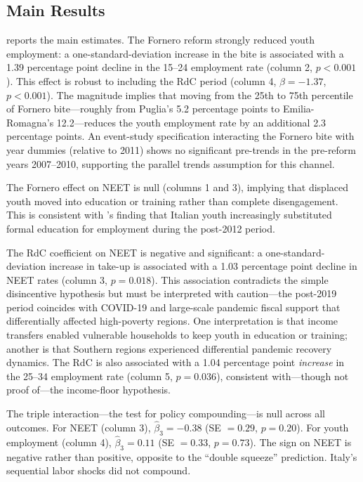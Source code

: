 \documentclass[12pt]{article}
\begin{document}
\subsection{Main Results}



 reports the main estimates. The Fornero reform strongly reduced youth employment: a one-standard-deviation increase in the bite is associated with a 1.39 percentage point decline in the 15--24 employment rate (column 2, $p < 0.001$). This effect is robust to including the RdC period (column 4, $\beta = -1.37$, $p < 0.001$). The magnitude implies that moving from the 25th to 75th percentile of Fornero bite---roughly from Puglia's 5.2 percentage points to Emilia-Romagna's 12.2---reduces the youth employment rate by an additional 2.3 percentage points. An event-study specification interacting the Fornero bite with year dummies (relative to 2011) shows no significant pre-trends in the pre-reform years 2007--2010, supporting the parallel trends assumption for this channel.

The Fornero effect on NEET is null (columns 1 and 3), implying that displaced youth moved into education or training rather than complete disengagement. This is consistent with \citet{ferrante2023}'s finding that Italian youth increasingly substituted formal education for employment during the post-2012 period.

The RdC coefficient on NEET is negative and significant: a one-standard-deviation increase in take-up is associated with a 1.03 percentage point decline in NEET rates (column 3, $p = 0.018$). This association contradicts the simple disincentive hypothesis but must be interpreted with caution---the post-2019 period coincides with COVID-19 and large-scale pandemic fiscal support that differentially affected high-poverty regions. One interpretation is that income transfers enabled vulnerable households to keep youth in education or training; another is that Southern regions experienced differential pandemic recovery dynamics. The RdC is also associated with a 1.04 percentage point \emph{increase} in the 25--34 employment rate (column 5, $p = 0.036$), consistent with---though not proof of---the income-floor hypothesis.

The triple interaction---the test for policy compounding---is null across all outcomes. For NEET (column 3), $\hat{\beta}_3 = -0.38$ (SE $= 0.29$, $p = 0.20$). For youth employment (column 4), $\hat{\beta}_3 = 0.11$ (SE $= 0.33$, $p = 0.73$). The sign on NEET is negative rather than positive, opposite to the ``double squeeze'' prediction. Italy's sequential labor shocks did not compound.
\end{document}
